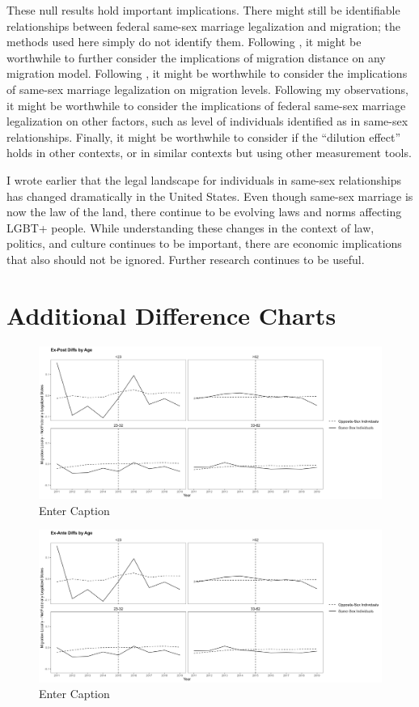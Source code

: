 \documentclass[12pt,letterpaper]{article}
\begin{document}
These null results hold important implications. There might still be identifiable relationships between federal same-sex marriage legalization and migration; the methods used here simply do not identify them. Following \citet{1, 12}, it might be worthwhile to further consider the implications of migration distance on any migration model. Following \citet{15}, it might be worthwhile to consider the implications of same-sex marriage legalization on migration levels. Following my observations, it might be worthwhile to consider the implications of federal same-sex marriage legalization on other factors, such as level of individuals identified as in same-sex relationships. Finally, it might be worthwhile to consider if the “dilution effect” holds in other contexts, or in similar contexts but using other measurement tools.

I wrote earlier that the legal landscape for individuals in same-sex relationships has changed dramatically in the United States. Even though same-sex marriage is now the law of the land, there continue to be evolving laws and norms affecting LGBT+ people. While understanding these changes in the context of law, politics, and culture continues to be important, there are economic implications that also should not be ignored. Further research continues to be useful.

\newpage



\appendix
\section{Additional Difference Charts}

\begin{figure}
    \centering
    \includegraphics[width=0.75\linewidth]{outputs/summary_stats/age_post_diffs.png}
    \caption{Enter Caption}
    \label{fig: fig:enter-label}
\end{figure}

\begin{figure}
    \centering
    \includegraphics[width=0.75\linewidth]{outputs/summary_stats/age_ante_diffs.png}
    \caption{Enter Caption}
    \label{fig: fig:enter-label}
\end{figure}
\end{document}
